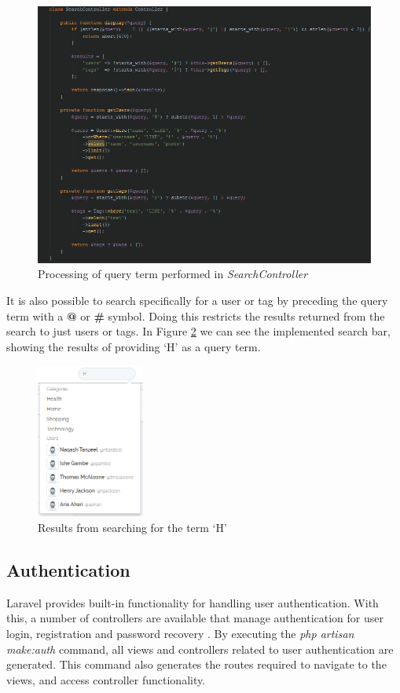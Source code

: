 \begin{figure}[H]
\centering
\includegraphics[width=1\textwidth]{Images/Implementation/SearchController}
\caption{Processing of query term performed in \textit{SearchController}}
\label{fig:SearchController}
\end{figure}

It is also possible to search specifically for a user or tag by preceding the query term with a \textbf{@} or \textbf{\#} symbol. Doing this restricts the results returned from the search to just users or tags. In Figure \ref{fig:SearchResults} we can see the implemented search bar, showing the results of providing `H' as a query term.

\begin{figure}[H]
\centering
\includegraphics[height=2in]{Images/Implementation/SearchResults}
\caption{Results from searching for the term `H'}
\label{fig:SearchResults}
\end{figure}

\subsection{Authentication}
Laravel provides built-in functionality for handling user authentication. With this, a number of controllers are available that manage authentication for user login, registration and password recovery \cite{Laravel:Authentication}. By executing the \textit{php artisan make:auth} command, all views and controllers related to user authentication are generated. This command also generates the routes required to navigate to the views, and access controller functionality.

